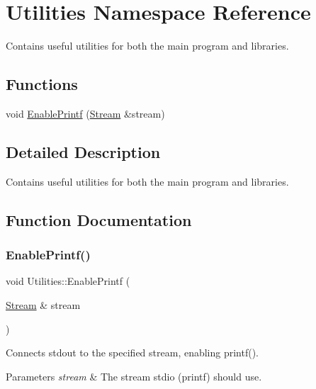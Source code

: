 \hypertarget{namespace_utilities}{}\section{Utilities Namespace Reference}
\label{namespace_utilities}


Contains useful utilities for both the main program and libraries.  


\subsection*{Functions}
\begin{DoxyCompactItemize}
\item 
void \hyperlink{namespace_utilities_a7175bc91000cbd130685885c6a24ea9a}{Enable\+Printf} (\hyperlink{class_stream}{Stream} \&stream)
\end{DoxyCompactItemize}


\subsection{Detailed Description}
Contains useful utilities for both the main program and libraries. 

\subsection{Function Documentation}
\hypertarget{namespace_utilities_a7175bc91000cbd130685885c6a24ea9a}{}\label{namespace_utilities_a7175bc91000cbd130685885c6a24ea9a} 
\subsubsection{\texorpdfstring{Enable\+Printf()}{EnablePrintf()}}
{\footnotesize\ttfamily void Utilities\+::\+Enable\+Printf (\begin{DoxyParamCaption}\item[{\hyperlink{class_stream}{Stream} \&}]{stream }\end{DoxyParamCaption})}

Connects stdout to the specified stream, enabling printf(). 
\begin{DoxyParams}{Parameters}
{\em stream} & The stream stdio (printf) should use. \\
\hline
\end{DoxyParams}

